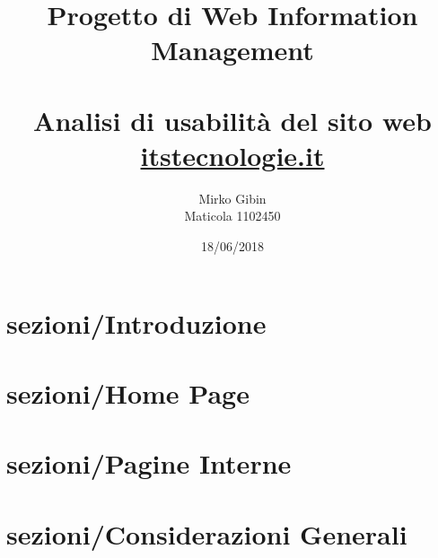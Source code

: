 \documentclass{book}
\author {Mirko Gibin \\ Maticola 1102450}
\date{18/06/2018}
\title {Progetto di Web Information Management \\ ~\\
\large Analisi di usabilità del sito web \\ \url{itstecnologie.it}}
\begin{document}
	\maketitle
	
	\section{sezioni/Introduzione}
	\section{sezioni/Home Page}
	\section{sezioni/Pagine Interne}
	\section{sezioni/Considerazioni Generali}
\end{document}
